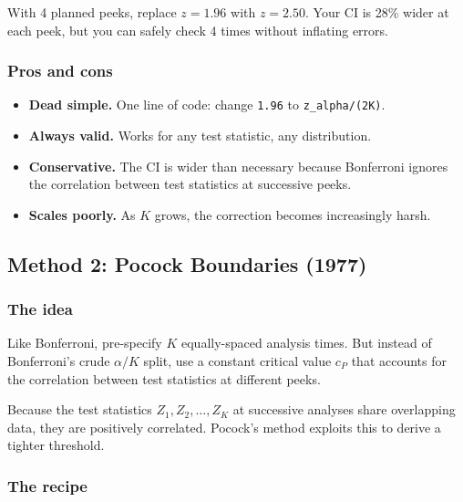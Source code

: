 \documentclass[12pt, a4paper]{article}
\begin{document}
\begin{plainlanguage}
With 4 planned peeks, replace $z = 1.96$ with $z = 2.50$.  Your CI is
28\% wider at each peek, but you can safely check 4 times without
inflating errors.
\end{plainlanguage}

\subsubsection*{Pros and cons}

\begin{itemize}[nosep]
  \item[\textcolor{green!60!black}{+}] \textbf{Dead simple.}  One line of
        code: change \texttt{1.96} to \texttt{z\_alpha/(2K)}.
  \item[\textcolor{green!60!black}{+}] \textbf{Always valid.}  Works for
        any test statistic, any distribution.
  \item[\textcolor{red}{--}] \textbf{Conservative.}  The CI is wider than
        necessary because Bonferroni ignores the correlation between test
        statistics at successive peeks.
  \item[\textcolor{red}{--}] \textbf{Scales poorly.}  As $K$ grows, the
        correction becomes increasingly harsh.
\end{itemize}


\subsection{Method 2: Pocock Boundaries (1977)}

\subsubsection*{The idea}

Like Bonferroni, pre-specify $K$ equally-spaced analysis times.  But instead
of Bonferroni's crude $\alpha/K$ split, use a constant critical value $c_P$
that accounts for the correlation between test statistics at different peeks.

Because the test statistics $Z_1, Z_2, \ldots, Z_K$ at successive analyses
share overlapping data, they are positively correlated.  Pocock's method
exploits this to derive a tighter threshold.

\subsubsection*{The recipe}
\end{document}
